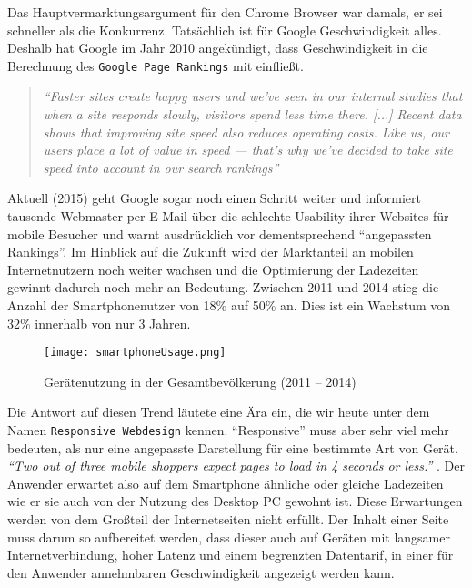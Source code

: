 		Das Hauptvermarktungsargument für den Chrome Browser war damals, er sei schneller als die Konkurrenz. Tatsächlich ist für Google Geschwindigkeit alles. Deshalb hat Google im Jahr 2010 angekündigt, dass Geschwindigkeit in die Berechnung des \texttt{Google Page Rankings} mit einfließt.

		\begin{quote}\itshape
			"`Faster sites create happy users and we've seen in our internal studies that when a site responds slowly, visitors spend less time there. [...] Recent data shows that improving site speed also reduces operating costs. Like us, our users place a lot of value in speed — that's why we've decided to take site speed into account in our search rankings"'\autocite{google10}
		\end{quote}

		Aktuell (2015) geht Google sogar noch einen Schritt weiter und informiert tausende Webmaster per E-Mail über die schlechte Usability ihrer Websites für mobile Besucher und warnt ausdrücklich vor dementsprechend "`angepassten Rankings"'.\autocite{t3n15}
		Im Hinblick auf die Zukunft wird der Marktanteil an mobilen Internetnutzern noch weiter wachsen und die Optimierung der Ladezeiten gewinnt dadurch noch mehr an Bedeutung. Zwischen 2011 und 2014 stieg die Anzahl der Smartphonenutzer von 18\% auf 50\% an. Dies ist ein Wachstum von 32\% innerhalb von nur 3 Jahren.\autocite{tns14}\\

		\begin{figure}[htbp]
			\begin{center}
				\texttt{[image: smartphoneUsage.png]}
			\end{center}
			\caption{Gerätenutzung in der Gesamtbevölkerung (2011 – 2014)\autocite{tns14}}
			\label{fig:geraetenutzung}
		\end{figure}

		Die Antwort auf diesen Trend läutete eine Ära ein, die wir heute unter dem Namen \texttt{Responsive Webdesign} kennen. "`Responsive"' muss aber sehr viel mehr bedeuten, als nur eine angepasste Darstellung für eine bestimmte Art von Gerät. \textit{"`Two out of three mobile shoppers expect pages to load in 4 seconds or less."'} \autocite{radware13}. Der Anwender erwartet also auf dem Smartphone ähnliche oder gleiche Ladezeiten wie er sie auch von der Nutzung des Desktop PC gewohnt ist. Diese Erwartungen werden von dem Großteil der Internetseiten nicht erfüllt. Der Inhalt einer Seite muss darum so aufbereitet werden, dass dieser auch auf Geräten mit langsamer Internetverbindung, hoher Latenz und einem begrenzten Datentarif, in einer für den Anwender annehmbaren Geschwindigkeit angezeigt werden kann.\\

